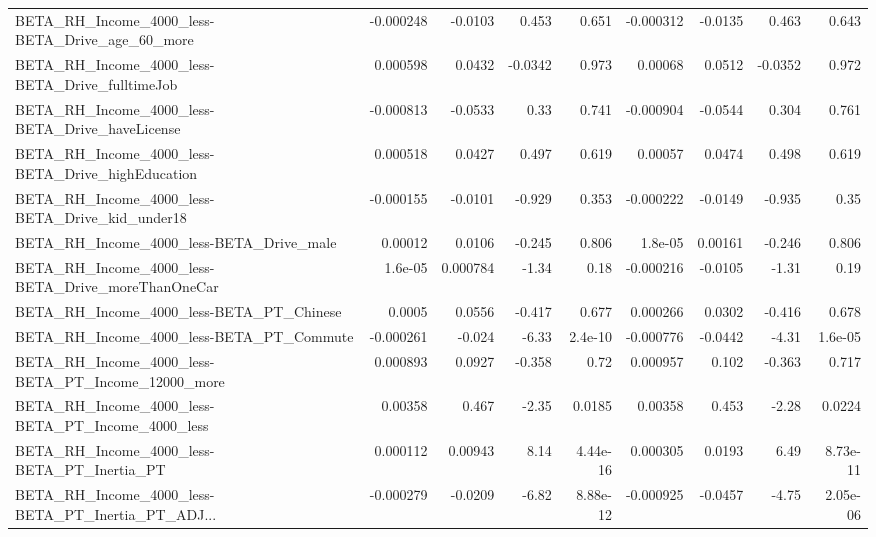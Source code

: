 \begin{tabular}{lrrrrrrrr}
BETA\_RH\_Income\_4000\_less-BETA\_Drive\_age\_60\_more    &   -0.000248 &      -0.0103 &    0.453 &    0.651 &  -0.000312 &     -0.0135 &        0.463 &         0.643 \\
BETA\_RH\_Income\_4000\_less-BETA\_Drive\_fulltimeJob    &    0.000598 &       0.0432 &  -0.0342 &    0.973 &    0.00068 &      0.0512 &      -0.0352 &         0.972 \\
BETA\_RH\_Income\_4000\_less-BETA\_Drive\_haveLicense    &   -0.000813 &      -0.0533 &     0.33 &    0.741 &  -0.000904 &     -0.0544 &        0.304 &         0.761 \\
BETA\_RH\_Income\_4000\_less-BETA\_Drive\_highEducation  &    0.000518 &       0.0427 &    0.497 &    0.619 &    0.00057 &      0.0474 &        0.498 &         0.619 \\
BETA\_RH\_Income\_4000\_less-BETA\_Drive\_kid\_under18    &   -0.000155 &      -0.0101 &   -0.929 &    0.353 &  -0.000222 &     -0.0149 &       -0.935 &          0.35 \\
BETA\_RH\_Income\_4000\_less-BETA\_Drive\_male           &     0.00012 &       0.0106 &   -0.245 &    0.806 &    1.8e-05 &     0.00161 &       -0.246 &         0.806 \\
BETA\_RH\_Income\_4000\_less-BETA\_Drive\_moreThanOneCar &     1.6e-05 &     0.000784 &    -1.34 &     0.18 &  -0.000216 &     -0.0105 &        -1.31 &          0.19 \\
BETA\_RH\_Income\_4000\_less-BETA\_PT\_Chinese           &      0.0005 &       0.0556 &   -0.417 &    0.677 &   0.000266 &      0.0302 &       -0.416 &         0.678 \\
BETA\_RH\_Income\_4000\_less-BETA\_PT\_Commute           &   -0.000261 &       -0.024 &    -6.33 &  2.4e-10 &  -0.000776 &     -0.0442 &        -4.31 &       1.6e-05 \\
BETA\_RH\_Income\_4000\_less-BETA\_PT\_Income\_12000\_more &    0.000893 &       0.0927 &   -0.358 &     0.72 &   0.000957 &       0.102 &       -0.363 &         0.717 \\
BETA\_RH\_Income\_4000\_less-BETA\_PT\_Income\_4000\_less  &     0.00358 &        0.467 &    -2.35 &   0.0185 &    0.00358 &       0.453 &        -2.28 &        0.0224 \\
BETA\_RH\_Income\_4000\_less-BETA\_PT\_Inertia\_PT        &    0.000112 &      0.00943 &     8.14 & 4.44e-16 &   0.000305 &      0.0193 &         6.49 &      8.73e-11 \\
BETA\_RH\_Income\_4000\_less-BETA\_PT\_Inertia\_PT\_ADJ... &   -0.000279 &      -0.0209 &    -6.82 & 8.88e-12 &  -0.000925 &     -0.0457 &        -4.75 &      2.05e-06 \\

\end{tabular}
